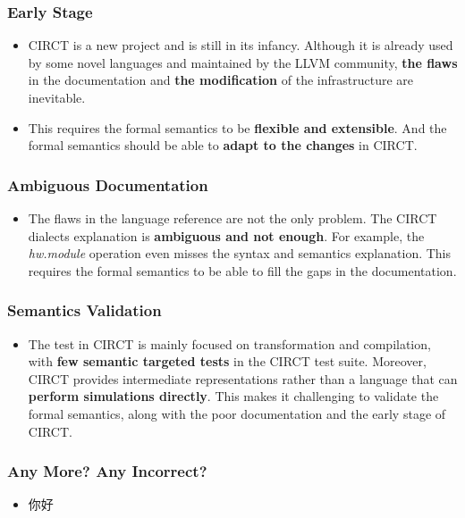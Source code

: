 \documentclass{beamer}
\begin{document}
\begin{frame}
    \frametitle{Early Stage}
    \begin{itemize}
        \item CIRCT is a new project and is still in its infancy. Although it is already used by some novel languages and maintained by the LLVM community, \textbf{the flaws} in the documentation and \textbf{the modification} of the infrastructure are inevitable. 
        \item This requires the formal semantics to be \textbf{flexible and extensible}. And the formal semantics should be able to \textbf{adapt to the changes} in CIRCT.
    \end{itemize}
\end{frame}

\begin{frame}
    \frametitle{Ambiguous Documentation}
    \begin{itemize}
        \item The flaws in the language reference are not the only problem. The CIRCT dialects explanation is \textbf{ambiguous and not enough}. For example, the \textit{hw.module} operation even misses the syntax and semantics explanation. This requires the formal semantics to be able to fill the gaps in the documentation.
    \end{itemize}
\end{frame}

\begin{frame}
    \frametitle{Semantics Validation}
    \begin{itemize}
        \item The test in CIRCT is mainly focused on transformation and compilation, with \textbf{few semantic targeted tests} in the CIRCT test suite. Moreover, CIRCT provides intermediate representations rather than a language that can \textbf{perform simulations directly}. This makes it challenging to validate the formal semantics, along with the poor documentation and the early stage of CIRCT.
    \end{itemize}
\end{frame}

\begin{frame}
    \frametitle{Any More? Any Incorrect?}
    \begin{itemize}
        \item 你好
    \end{itemize}
\end{frame}
\end{document}
